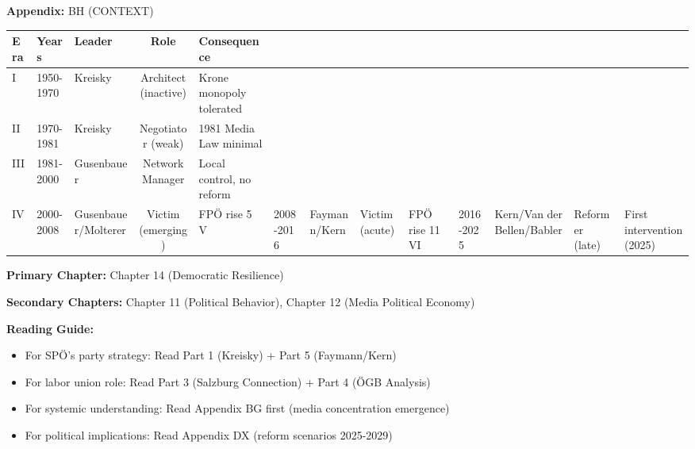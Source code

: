
\begin{tcolorbox}[colback=yellow!5!white, colframe=yellow!75!black,
    title=Quick Reference: SPÖ's Six Eras in Media Politics]
\textbf{Appendix:} BH (CONTEXT)


\begin{tabular}{@{}lllcl@{}}
\textbf{Era} & \textbf{Years} & \textbf{Leader} & \textbf{Role} & \textbf{Consequence} \\
\midrule
I & 1950-1970 & Kreisky & Architect (inactive) & Krone monopoly tolerated \\
II & 1970-1981 & Kreisky & Negotiator (weak) & 1981 Media Law minimal \\
III & 1981-2000 & Gusenbauer & Network Manager & Local control, no reform \\
IV & 2000-2008 & Gusenbauer/Molterer & Victim (emerging) & FPÖ rise 5%
V & 2008-2016 & Faymann/Kern & Victim (acute) & FPÖ rise 11%
VI & 2016-2025 & Kern/Van der Bellen/Babler & Reformer (late) & First intervention (2025) \\
\end{tabular}

\end{tcolorbox}


\begin{tcolorbox}[colback=purple!5!white, colframe=purple!75!black,
    title=Chapter Linkage]

\textbf{Primary Chapter:} Chapter 14 (Democratic Resilience)

\textbf{Secondary Chapters:} Chapter 11 (Political Behavior), Chapter 12 (Media Political Economy)

\textbf{Reading Guide:}
\begin{itemize}[nosep]
\item For SPÖ's party strategy: Read Part 1 (Kreisky) + Part 5 (Faymann/Kern)
\item For labor union role: Read Part 3 (Salzburg Connection) + Part 4 (ÖGB Analysis)
\item For systemic understanding: Read Appendix BG first (media concentration emergence)
\item For political implications: Read Appendix DX (reform scenarios 2025-2029)
\end{itemize}

\end{tcolorbox}


